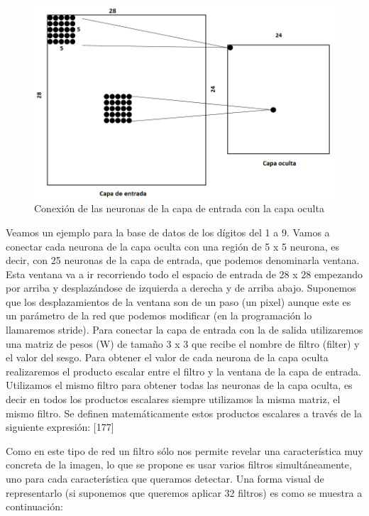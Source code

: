 \documentclass[
  a4paper,
  DIV=11,
  numbers=noendperiod]{scrreprt}
\begin{document}
\begin{figure}

{\centering \includegraphics{imagenes/capitulo1/conexion_neuronas_convolucional.png}

}

\caption{\label{fig-conexion-neuronas-convolucional}Conexión de las
neuronas de la capa de entrada con la capa oculta}

\end{figure}

Veamos un ejemplo para la base de datos de los dígitos del 1 a 9. Vamos
a conectar cada neurona de la capa oculta con una región de 5 x 5
neurona, es decir, con 25 neuronas de la capa de entrada, que podemos
denominarla ventana. Esta ventana va a ir recorriendo todo el espacio de
entrada de 28 x 28 empezando por arriba y desplazándose de izquierda a
derecha y de arriba abajo. Suponemos que los desplazamientos de la
ventana son de un paso (un pixel) aunque este es un parámetro de la red
que podemos modificar (en la programación lo llamaremos stride). Para
conectar la capa de entrada con la de salida utilizaremos una matriz de
pesos (W) de tamaño 3 x 3 que recibe el nombre de filtro (filter) y el
valor del sesgo. Para obtener el valor de cada neurona de la capa oculta
realizaremos el producto escalar entre el filtro y la ventana de la capa
de entrada. Utilizamos el mismo filtro para obtener todas las neuronas
de la capa oculta, es decir en todos los productos escalares siempre
utilizamos la misma matriz, el mismo filtro. Se definen matemáticamente
estos productos escalares a través de la siguiente expresión: {[}177{]}

Como en este tipo de red un filtro sólo nos permite revelar una
característica muy concreta de la imagen, lo que se propone es usar
varios filtros simultáneamente, uno para cada característica que
queramos detectar. Una forma visual de representarlo (si suponemos que
queremos aplicar 32 filtros) es como se muestra a continuación:
\end{document}
